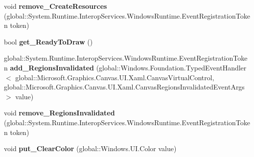 \begin{DoxyCompactItemize}
\item 
\mbox{\label{class_microsoft_1_1_graphics_1_1_canvas_1_1_u_i_1_1_xaml_1_1_canvas_virtual_control_a12628d4980246897d39f0971c3287ca0}} 
void {\bfseries remove\+\_\+\+Create\+Resources} (global\+::\+System.\+Runtime.\+Interop\+Services.\+Windows\+Runtime.\+Event\+Registration\+Token token)
\item 
\mbox{\label{class_microsoft_1_1_graphics_1_1_canvas_1_1_u_i_1_1_xaml_1_1_canvas_virtual_control_af6528db89b7f78c8130c559d594d8300}} 
bool {\bfseries get\+\_\+\+Ready\+To\+Draw} ()
\item 
\mbox{\label{class_microsoft_1_1_graphics_1_1_canvas_1_1_u_i_1_1_xaml_1_1_canvas_virtual_control_a4e2d94f4f40419484642f72168ab3bb1}} 
global\+::\+System.\+Runtime.\+Interop\+Services.\+Windows\+Runtime.\+Event\+Registration\+Token {\bfseries add\+\_\+\+Regions\+Invalidated} (global\+::\+Windows.\+Foundation.\+Typed\+Event\+Handler$<$ global\+::\+Microsoft.\+Graphics.\+Canvas.\+U\+I.\+Xaml.\+Canvas\+Virtual\+Control, global\+::\+Microsoft.\+Graphics.\+Canvas.\+U\+I.\+Xaml.\+Canvas\+Regions\+Invalidated\+Event\+Args $>$ value)
\item 
\mbox{\label{class_microsoft_1_1_graphics_1_1_canvas_1_1_u_i_1_1_xaml_1_1_canvas_virtual_control_a6ca7dfb4d3d175d3b2a55029b1f0f300}} 
void {\bfseries remove\+\_\+\+Regions\+Invalidated} (global\+::\+System.\+Runtime.\+Interop\+Services.\+Windows\+Runtime.\+Event\+Registration\+Token token)
\item 
\mbox{\label{class_microsoft_1_1_graphics_1_1_canvas_1_1_u_i_1_1_xaml_1_1_canvas_virtual_control_af130409d50f1c44d00f3db3c4c54e318}} 
void {\bfseries put\+\_\+\+Clear\+Color} (global\+::\+Windows.\+U\+I.\+Color value)
\item 
\mbox{\label{class_microsoft_1_1_graphics_1_1_canvas_1_1_u_i_1_1_xaml_1_1_canvas_virtual_control_ad85b4cdd55249b068fd5faca1d6a7339}} 

\end{DoxyCompactItemize}
